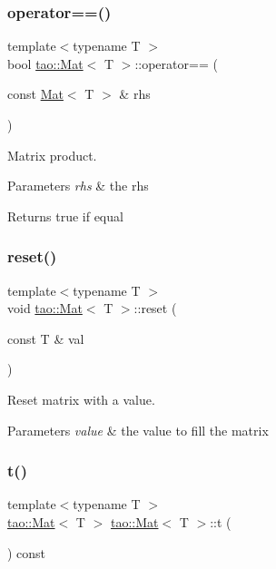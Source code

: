 \subsubsection{\texorpdfstring{operator==()}{operator==()}}
{\footnotesize\ttfamily template$<$typename T $>$ \\
bool \mbox{\hyperlink{classtao_1_1_mat}{tao\+::\+Mat}}$<$ T $>$\+::operator== (\begin{DoxyParamCaption}\item[{const \mbox{\hyperlink{classtao_1_1_mat}{Mat}}$<$ T $>$ \&}]{rhs }\end{DoxyParamCaption})}



Matrix product. 


\begin{DoxyParams}{Parameters}
{\em rhs} & the rhs \\
\hline
\end{DoxyParams}
\begin{DoxyReturn}{Returns}
true if equal 
\end{DoxyReturn}
\mbox{\label{classtao_1_1_mat_a503d508f8f80c64a494f323649f20c55}} 
\subsubsection{\texorpdfstring{reset()}{reset()}}
{\footnotesize\ttfamily template$<$typename T $>$ \\
void \mbox{\hyperlink{classtao_1_1_mat}{tao\+::\+Mat}}$<$ T $>$\+::reset (\begin{DoxyParamCaption}\item[{const T \&}]{val }\end{DoxyParamCaption})}



Reset matrix with a value. 


\begin{DoxyParams}{Parameters}
{\em value} & the value to fill the matrix \\
\hline
\end{DoxyParams}
\mbox{\label{classtao_1_1_mat_a2d900f9207772d4adcaaff6c697a9839}} 
\subsubsection{\texorpdfstring{t()}{t()}}
{\footnotesize\ttfamily template$<$typename T $>$ \\
\mbox{\hyperlink{classtao_1_1_mat}{tao\+::\+Mat}}$<$ T $>$ \mbox{\hyperlink{classtao_1_1_mat}{tao\+::\+Mat}}$<$ T $>$\+::t (\begin{DoxyParamCaption}{ }\end{DoxyParamCaption}) const}




